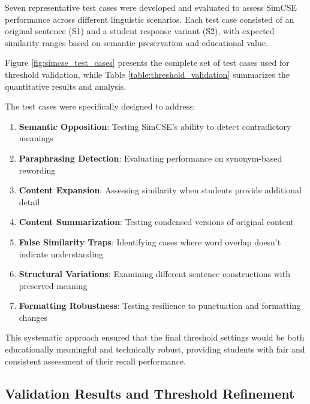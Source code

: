 {\color{maroon}
Seven representative test cases were developed and evaluated to assess SimCSE performance across different linguistic scenarios. Each test case consisted of an original sentence (S1) and a student response variant (S2), with expected similarity ranges based on semantic preservation and educational value.

Figure \ref{fig:simcse_test_cases} presents the complete set of test cases used for threshold validation, while Table \ref{table:threshold_validation} summarizes the quantitative results and analysis.

The test cases were specifically designed to address:
\begin{enumerate}
    \item \textbf{Semantic Opposition}: Testing SimCSE's ability to detect contradictory meanings
    \item \textbf{Paraphrasing Detection}: Evaluating performance on synonym-based rewording
    \item \textbf{Content Expansion}: Assessing similarity when students provide additional detail
    \item \textbf{Content Summarization}: Testing condensed versions of original content
    \item \textbf{False Similarity Traps}: Identifying cases where word overlap doesn't indicate understanding
    \item \textbf{Structural Variations}: Examining different sentence constructions with preserved meaning
    \item \textbf{Formatting Robustness}: Testing resilience to punctuation and formatting changes
\end{enumerate}

This systematic approach ensured that the final threshold settings would be both educationally meaningful and technically robust, providing students with fair and consistent assessment of their recall performance.
}





\subsection{Validation Results and Threshold Refinement}

